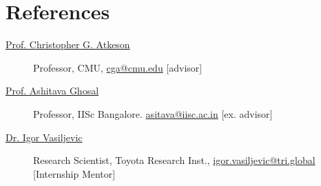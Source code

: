 \documentclass[letterpaper,11pt]{article}
\begin{document}

\section{References}
\begin{description}
  \item[\href{https://www.cs.cmu.edu/~cga/}{Prof. Christopher G. Atkeson }] Professor, CMU, \href{mailto:cga@cmu.edu}{cga@cmu.edu} [advisor]
  \vspace{-0.1 in}
  \item[\href{https://mecheng.iisc.ac.in/~asitava/}{Prof. Ashitava Ghosal}] Professor, IISc Bangalore.  \href{mailto:asitava@iisc.ac.in}{asitava@iisc.ac.in} [ex. advisor]
  \vspace{-0.1 in}
  \item[\href{https://www.linkedin.com/in/igor-vasiljevic-9ba0a951/}{Dr. Igor Vasiljevic
}] Research Scientist, Toyota Research Inst., \href{mailto:igor.vasiljevic@tri.global}{igor.vasiljevic@tri.global} [Internship Mentor]
  \end{description}
  
\end{document}
